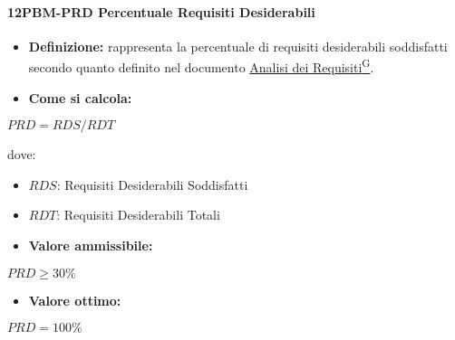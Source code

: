 \paragraph*{12PBM-PRD Percentuale Requisiti Desiderabili}
\begin{itemize}
    \item \textbf{Definizione:} rappresenta la percentuale di requisiti desiderabili soddisfatti secondo quanto definito nel documento \href{https://code7crusaders.github.io/docs/RTB/documentazione_interna/glossario.html#analisi-dei-requisiti}{Analisi dei Requisiti\textsuperscript{G}}.
    \item \textbf{Come si calcola:}
\end{itemize}
\begin{center}
   $PRD = RDS/RDT$ 
\end{center}
dove:
\begin{itemize}[label=$\rightarrow$]
    \item $RDS$: Requisiti Desiderabili Soddisfatti
    \item $RDT$: Requisiti Desiderabili Totali
\end{itemize}
\begin{itemize}
    \item \textbf{Valore ammissibile:}
\end{itemize}
\begin{center}
    $PRD \geq 30\%$
\end{center}
\begin{itemize}
    \item \textbf{Valore ottimo:}
\end{itemize}
\begin{center}
    $PRD = 100\%$
\end{center}

